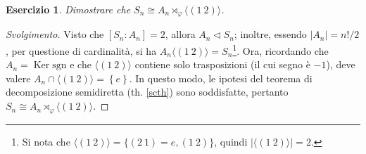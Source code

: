 \documentclass[11pt]{article}
\theoremstyle{style}
\newtheorem{esercizio}{Esercizio}[section]
\newenvironment{svolgimento}{\renewcommand\qedsymbol{$\blacksquare$}\begin{proof}[Svolgimento]}{\end{proof}}
\numberwithin{equation}{subsection}
\begin{document}
\begin{esercizio}
Dimostrare che $S_n \cong A_n \rtimes _\varphi \langle (1 \ 2) \rangle$.
\end{esercizio}
\begin{svolgimento}
	Visto che $[S_n : A_n] = 2$, allora $A_n \lhd S_n$; inoltre, essendo $\lvert A_n \rvert = n! / 2$, per questione di cardinalit\`a, si ha $A_n \langle (1 \ 2) \rangle = S_n$\footnote{Si nota che $\langle (1 \ 2) \rangle=\big\{ (2\ 1) = e , (1\ 2) \big\} $, quindi $\lvert \langle (1\ 2) \rangle \rvert =2$.}.
	Ora, ricordando che $A_ n = \operatorname{Ker} \mathrm{sgn} $ e che $\langle (1\ 2) \rangle$ contiene solo trasposizioni (il cui segno \`e $-1$), deve valere $A_n \cap \langle (1\ 2) \rangle = \left\{ e \right\} $.
	In questo modo, le ipotesi del teorema di decomposizione semidiretta (th. \ref{scth}) sono soddisfatte, pertanto $S_n \cong A_n \rtimes _\varphi \langle (1 \ 2) \rangle$.
\end{svolgimento}
\end{document}
